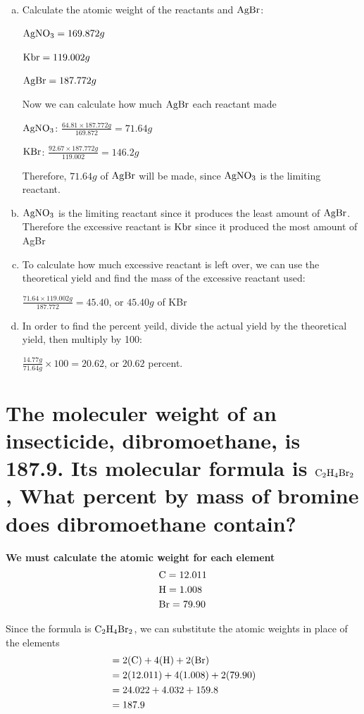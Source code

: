 \documentclass{scrartcl}
\begin{document}
\begin{enumerate}[a.]
\item Calculate the atomic weight of the reactants and \(\ce{AgBr}\):

\(\ce{AgNO3} = 169.872g\)

\(\ce{Kbr} = 119.002g\)

\(\ce{AgBr} = 187.772g\)

Now we can calculate how much \(\ce{AgBr}\) each reactant made

\(\ce{AgNO3}\): \(\frac{64.81\times187.772g}{169.872}=71.64g\)

\(\ce{KBr}\): \(\frac{92.67\times187.772g}{119.002}=146.2g\)

Therefore,   \(71.64g\) of \(\ce{AgBr}\) will be made, since \(\ce{AgNO3}\) is the limiting reactant.

\item \(\ce{AgNO3}\) is the limiting reactant since it produces the least amount of
\(\ce{AgBr}\). Therefore the excessive reactant is  \(\ce{Kbr}\) since it
produced the most amount of AgBr
\item To calculate how much excessive reactant is left over, we can use the
theoretical yield and find the mass of the excessive reactant used:

\(\frac{71.64\times119.002g}{187.772}=45.40\), or \(45.40g\) of KBr
\item In order to find the percent yeild, divide the actual yield by the
theoretical yield, then multiply by 100:

\(\frac{14.77g}{71.64g}\times100=20.62\), or \(20.62\) percent.
\end{enumerate}

\section{The moleculer weight of an insecticide, dibromoethane, is 187.9. Its molecular formula is \(\ce{C2H4Br2}\), What percent by mass of bromine does dibromoethane contain?}
\label{sec:orgecc644d}
\textbf{We must calculate the atomic weight for each element}
\begin{align*}
&\ce{C} = 12.011\\
&\ce{H} = 1.008\\
&\ce{Br} = 79.90
\end{align*}

Since the formula is  \(\ce{C2H4Br2}\), we can substitute the atomic weights in
place of the elements
\begin{align*}
&= 2(\ce{C}) + 4(\ce{H}) + 2(\ce{Br})\\
&= 2(12.011) + 4(1.008) + 2(79.90)\\
&= 24.022 + 4.032 + 159.8\\
&= 187.9
\end{align*}
\end{document}
